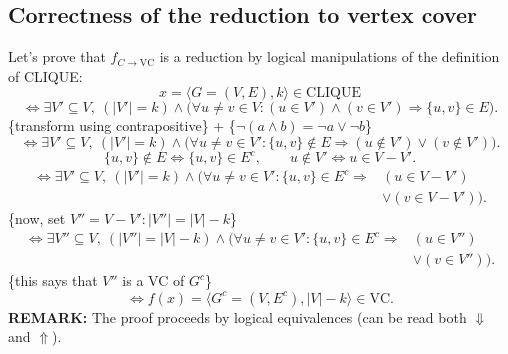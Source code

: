 \subsection{Correctness of the reduction to vertex cover}
Let's prove that $f_{C\to\mathrm{VC}}$ is a reduction by logical manipulations of the definition of CLIQUE:
\[
x=\langle G=(V,E),k\rangle\in\mathrm{CLIQUE}
\]
\[
\Longleftrightarrow\exists V'\subseteq V,\ (|V'|=k)\land
\bigl(\forall u\neq v\in V:(u\in V')\land(v\in V')\Rightarrow\{u,v\}\in E\bigr).
\]
\{transform using contrapositive\} + \{$\neg(a\land b)=\neg a\lor\neg b$\}
\[
\Longleftrightarrow\exists V'\subseteq V,\ (|V'|=k)\land
\bigl(\forall u\neq v\in V':\{u,v\}\notin E\Rightarrow(u\notin V')\lor(v\notin V')\bigr).
\]
\[\{u,v\}\notin E\Longleftrightarrow\{u,v\}\in E^c,\qquad u\notin V'\Longleftrightarrow u\in V-V'.\]
\[
\begin{aligned}
\Longleftrightarrow\exists V'\subseteq V,\ (|V'|=k)\land\bigl(\forall u\neq v\in V':\{u,v\}\in E^c\Rightarrow{}& (u\in V-V')\\&\lor(v\in V-V')\bigr).
\end{aligned}
\]
\{now, set $V''=V-V':|V''|=|V|-k$\}
\[
\begin{aligned}
\Longleftrightarrow\exists V''\subseteq V,\ (|V''|=|V|-k)\land\bigl(\forall u\neq v\in V':\{u,v\}\in E^c\Rightarrow{}&(u\in V'')\\&\lor(v\in V'')\bigr).
\end{aligned}
\]
\{this says that $V''$ is a VC of $G^c$\}
\[\Longleftrightarrow f(x)=\langle G^c=(V,E^c),|V|-k\rangle\in\mathrm{VC}.\]
\textbf{REMARK:} The proof proceeds by logical equivalences (can be read both $\Downarrow$ and $\Uparrow$).
